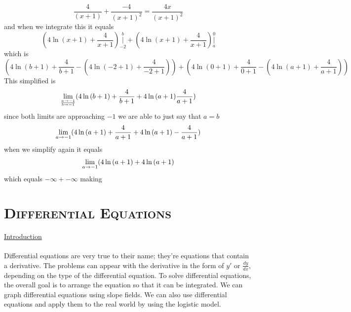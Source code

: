 \documentclass[a4paper,openright, 10pt]{article}
\newcommand{\ssection}[1]{%
\section[#1]{\centering\normalfont\scshape #1}}
\begin{document}
$$\frac{4}{(x+1)}+\frac{-4}{(x+1)^2}=\frac{4x}{(x+1)^2}$$
and when we integrate this it equals $$(4\ln{(x+1)}+\frac{4}{x+1})|\limits_{-2}^{b}+(4\ln{(x+1)}+\frac{4}{x+1})|\limits_{a}^{0}$$
which is $$(4\ln{(b+1)}+\frac{4}{b+1}-(4\ln{(-2+1)}+\frac{4}{-2+1}))+(4\ln{(0+1)}+\frac{4}{0+1}-(4\ln{(a+1)}+\frac{4}{a+1}))$$
This simplified is
$$\lim_{\frac{a\to-\-1}{b\to-\-1}}(4\ln{(b+1)}+\frac{4}{b+1}+4\ln{(a+1)}\frac{4}{a+1})$$
since both limits are approaching $-1$ we are able to just say that $a=b$
 $$\lim_{a\to-\-1}(4\ln{(a+1)}+\frac{4}{a+1}+4\ln{(a+1)}-\frac{4}{a+1})$$
 when we simplify again it equals
 $$\lim_{a\to-\-1}(4\ln{(a+1)}+4\ln{(a+1)}$$
 which equals
 $-\infty+-\infty$ making \fbox{$-\infty$}
 \ssection{Differential Equations}
 \underline{Introduction}\\
 \\
 Differential equations are very true to their name; they're equations that contain a derivative. The problems can appear with the derivative in the form of $y'$ or $\frac{dy}{dx}$, depending on the type of the differential equation. To solve differential equations, the overall goal is to arrange the equation so that it can be integrated. We can graph differential equations using slope fields. We can also use differential equations and apply them to the real world by using the logistic model. 
\end{document}

